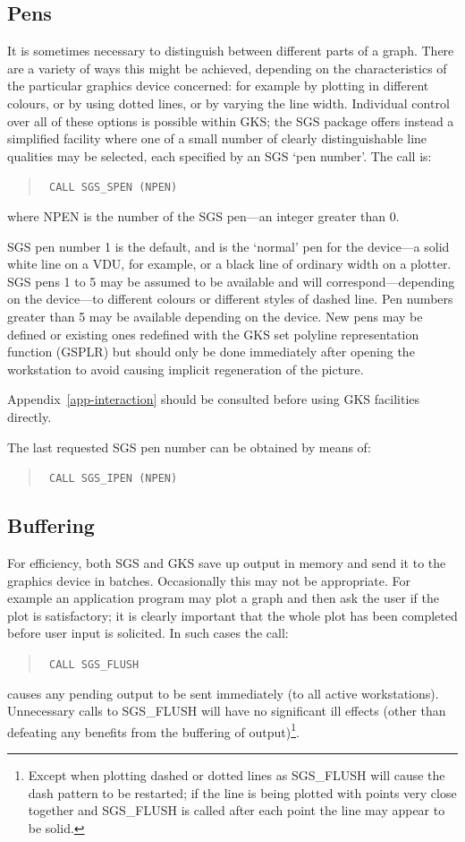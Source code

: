 \documentclass[11pt]{article}
\newcommand{\hyperref}[4]{#2\ref{#4}#3}
\newcommand{\htmlref}[2]{#1}
\begin{document}
\subsection {Pens}

It is sometimes necessary to distinguish between different parts
of a graph.  There are a variety
of ways this might be achieved, depending
on the characteristics of the particular graphics device
concerned: for example
by plotting in different
colours, or by using dotted lines, or by varying the
line width.  Individual control over all of
these options is possible within GKS;  the
SGS package offers instead a simplified facility
where one of a small
number of clearly distinguishable line qualities may
be selected, each specified by an SGS `pen number'.  The call is:
\begin{quote}{\tt
    CALL \htmlref{SGS\_SPEN}{SGS_SPEN} (NPEN)}
\end{quote}
where NPEN is the number of the SGS pen---an integer greater than 0.

SGS pen number 1 is the default, and is the `normal' pen for the
device---a solid white line on a VDU, for example, or a black
line of ordinary width on a plotter.  SGS pens 1 to 5
may be assumed to be available and will correspond---depending
on the device---to different colours or
different styles of dashed line.
Pen numbers greater than 5 may be available depending
on the device.  New pens may be defined or existing ones redefined with
the GKS set polyline representation function (GSPLR) but should only
be done immediately after opening the workstation to avoid causing implicit
regeneration of the picture.

\hyperref{This appendix}{Appendix~}{}{app-interaction} should be
consulted before using GKS facilities directly.

The last requested SGS pen number can be obtained by means of:
\begin{quote}{\tt
    CALL \htmlref{SGS\_IPEN}{SGS_IPEN} (NPEN)}
\end{quote}

\subsection {Buffering}

For efficiency, both SGS and GKS save up output
in memory and send it to the graphics device
in batches.  Occasionally
this may not be appropriate.  For example an application program
may plot a graph and then ask the user if the plot is
satisfactory;  it
is clearly important that the whole plot has been completed
before user input is
solicited.  In such cases the call:
\begin{quote}{\tt
    CALL \htmlref{SGS\_FLUSH}{SGS_FLUSH}}
\end{quote}
causes any pending output to be sent immediately (to all active
workstations).  Unnecessary calls to SGS\_FLUSH will have no significant
ill effects (other than defeating any benefits from the buffering of
output)\footnote{Except when plotting dashed or dotted lines as SGS\_FLUSH will
cause the dash pattern to be restarted; if the line is being plotted with
points very close together and SGS\_FLUSH is called after each point the
line may appear to be solid.}.
\end{document}
